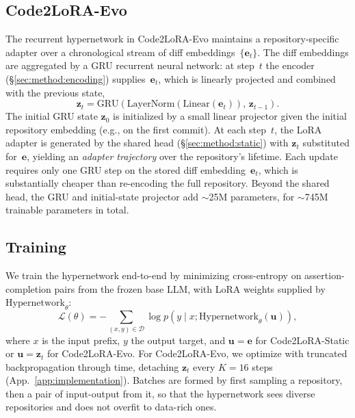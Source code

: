 \documentclass{llmxive}
\providecommand{\codelora}{Code2LoRA\xspace}
\providecommand{\codelorastatic}{\codelora-Static\xspace}
\providecommand{\codeloraevo}{\codelora-Evo\xspace}
\begin{document}
\subsection{\codeloraevo{}}
\label{sec:method:evo}

The recurrent hypernetwork in \codeloraevo{} maintains a repository-specific adapter over a chronological stream of diff embeddings~$\{\mathbf{e}_t\}$.
The diff embeddings are aggregated by a GRU recurrent neural network:
at step~$t$ the encoder (\S\ref{sec:method:encoding}) supplies~$\mathbf{e}_t$, which is linearly projected and combined with the previous state,
\begin{equation*}
\mathbf{z}_t = \mathrm{GRU}(\mathrm{LayerNorm}(\mathrm{Linear}(\mathbf{e}_t)),\, \mathbf{z}_{t-1}).
\end{equation*}
The initial GRU state $\mathbf{z}_0$ is initialized by a small linear projector given the initial repository embedding (e.g., on the first commit).
At each step~$t$, the LoRA adapter is generated by the shared head (\S\ref{sec:method:static}) with $\mathbf{z}_t$ substituted for~$\mathbf{e}$, yielding an \emph{adapter trajectory} over the repository's lifetime.
Each update requires only one GRU step on the stored diff embedding~$\mathbf{e}_t$, which is substantially cheaper than re-encoding the full repository.
Beyond the shared head, the GRU and initial-state projector add ${\sim}$25M parameters, for ${\sim}$745M trainable parameters in total.

\subsection{Training}
\label{sec:method:training}

We train the hypernetwork end-to-end by minimizing cross-entropy on assertion-completion pairs from the frozen base LLM, with LoRA weights supplied by $\mathrm{Hypernetwork}_\theta$:
\begin{equation*}
\mathcal{L}(\theta) = -\!\!\!\sum_{(x,y) \in \mathcal{D}}\!\!\! \log p\!\left(y \mid x; \mathrm{Hypernetwork}_\theta(\mathbf{u})\right),
\end{equation*}
where $x$ is the input prefix, $y$ the output target, and $\mathbf{u}=\mathbf{e}$ for \codelorastatic{} or $\mathbf{u}=\mathbf{z}_t$ for \codeloraevo{}.
For \codeloraevo{}, we optimize with truncated backpropagation through time, detaching $\mathbf{z}_t$ every $K{=}16$ steps (App.~\ref{app:implementation}).
Batches are formed by first sampling a repository, then a pair of input-output from it, so that the hypernetwork sees diverse repositories and does not overfit to data-rich ones.
\end{document}
